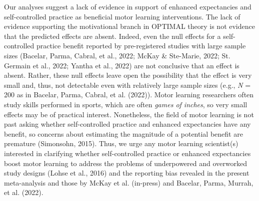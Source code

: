 \documentclass[
  doc, donotrepeattitle,floatsintext]{apa7}
\begin{document}
Our analyses suggest a lack of evidence in support of enhanced expectancies and self-controlled practice as beneficial motor learning interventions. The lack of evidence supporting the motivational branch in OPTIMAL theory is not evidence that the predicted effects are absent. Indeed, even the null effects for a self-controlled practice benefit reported by pre-registered studies with large sample sizes (Bacelar, Parma, Cabral, et al., 2022; McKay \& Ste-Marie, 2022; St. Germain et al., 2022; Yantha et al., 2022) are not conclusive that an effect is absent. Rather, these null effects leave open the possibility that the effect is very small and, thus, not detectable even with relatively large sample sizes (e.g., \emph{N} = 200 as in Bacelar, Parma, Cabral, et al. (2022)). Motor learning researchers often study skills performed in sports, which are often \emph{games of inches}, so very small effects may be of practical interest. Nonetheless, the field of motor learning is not past asking whether self-controlled practice and enhanced expectancies have any benefit, so concerns about estimating the magnitude of a potential benefit are premature (Simonsohn, 2015). Thus, we urge any motor learning scientist(s) interested in clarifying whether self-controlled practice or enhanced expectancies boost motor learning to address the problems of underpowered and overworked study designs (Lohse et al., 2016) and the reporting bias revealed in the present meta-analysis and those by McKay et al. (in-press) and Bacelar, Parma, Murrah, et al. (2022).
\end{document}
